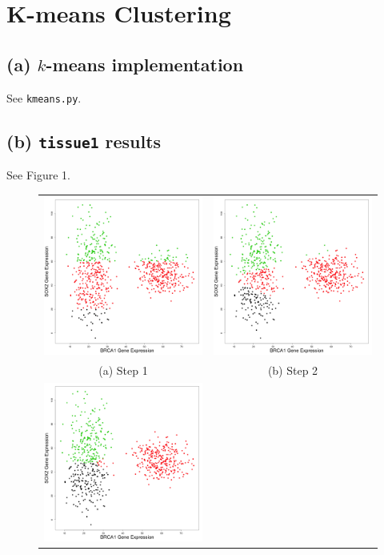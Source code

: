 \documentclass[11pt]{article}
\begin{document}
\section{K-means Clustering}
\subsection*{(a) $k$-means implementation}
See {\tt kmeans.py}.
\subsection*{(b) {\tt tissue1} results}
See Figure 1.
\begin{figure}
\begin{tabular}{c c}
    \includegraphics[width=65mm]{../tissue1_plots/cluster_step1.png} & 
    \includegraphics[width=65mm]{../tissue1_plots/cluster_step2.png} \\
    (a) Step 1 & (b) Step 2 \\
    \includegraphics[width=65mm]{../tissue1_plots/cluster_step3.png} & 

\end{tabular}
\end{figure}
\end{document}
